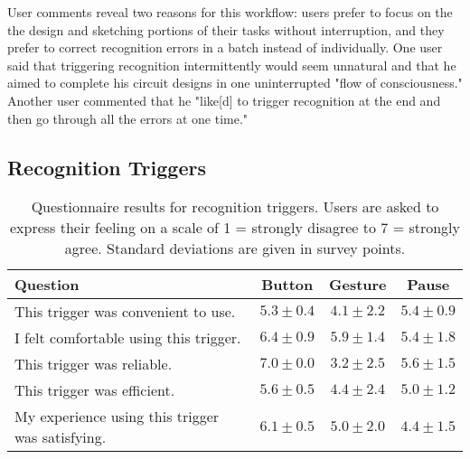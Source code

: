 \documentclass{egpubl}
\begin{document}
User comments reveal two reasons for this workflow: users prefer to
focus on the the design and sketching portions of their tasks without
interruption, and they prefer to correct recognition errors in a batch
instead of individually.  One user said that triggering
recognition intermittently would seem unnatural and that he aimed to
complete his circuit designs in one uninterrupted "flow of
consciousness."  Another user commented that he "like[d] to trigger
recognition at the end and then go through all the errors at one
time."



\subsection{Recognition Triggers}

\begin{table}
  \centering
	\begin{tabular}{|p{.35\linewidth}|c||c||c|}
	\hline 
  Question 																									& Button & Gesture & Pause \\
  \hline
  This trigger was convenient to use. 											& $5.3\pm0.4$ & $4.1\pm2.2$ & $5.4\pm0.9$ \\
  \hline
  I felt comfortable using this trigger. 										& $6.4\pm0.9$ & $5.9\pm1.4$ & $5.4\pm1.8$ \\
  \hline
  This trigger was reliable.																& $7.0\pm0.0$ & $3.2\pm2.5$ & $5.6\pm1.5$ \\
  \hline
  This trigger was efficient.																& $5.6\pm0.5$ & $4.4\pm2.4$ & $5.0\pm1.2$ \\
  \hline
  My experience using this trigger was satisfying.					& $6.1\pm0.5$ & $5.0\pm2.0$ & $4.4\pm1.5$ \\
  \hline
	\end{tabular}
	\caption{Questionnaire results for recognition triggers.  Users are asked to express their feeling on a scale of 
	1 = strongly disagree to 7 = strongly agree.  Standard deviations are given in survey points.}
	\label{tab:TableATriggerData}
\end{table}
\end{document}
